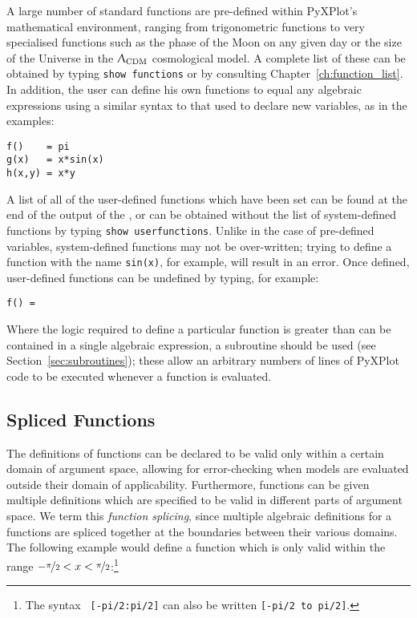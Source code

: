 A large number of standard functions are pre-defined within PyXPlot's
mathematical environment, ranging from trigonometric functions to very
specialised functions such as the phase of the Moon on any given day or the
size of the Universe in the $\Uplambda_\mathrm{CDM}$ cosmological model. A
complete list of these can be obtained by typing {\tt show
functions} or by consulting
Chapter~\ref{ch:function_list}. In addition, the user can define his own
functions to equal any algebraic expressions using a similar syntax to that
used to declare new variables, as in the examples:

\begin{verbatim}
f()    = pi
g(x)   = x*sin(x)
h(x,y) = x*y
\end{verbatim}

A list of all of the user-defined functions which have been set can be found at
the end of the output of the , or can be obtained
without the list of system-defined functions by typing {\tt show
userfunctions}. Unlike in the case of pre-defined
variables, system-defined functions may not be over-written; trying to define a
function with the name {\tt sin(x)}, for example, will result in an error.
Once defined, user-defined functions can be undefined by typing, for example:

\begin{verbatim}
f() =
\end{verbatim}

Where the logic required to define a particular function is greater than can be
contained in a single algebraic expression, a subroutine should be used (see
Section~\ref{sec:subroutines}); these allow an arbitrary numbers of lines of
PyXPlot code to be executed whenever a function is evaluated.

\subsection{Spliced Functions}  

The definitions of functions can be declared to be valid only within a certain
domain of argument space, allowing for error-checking when models are evaluated
outside their domain of applicability. Furthermore, functions can be given
multiple definitions which are specified to be valid in different parts of
argument space. We term this {\it function splicing}, since multiple algebraic
definitions for a functions are spliced together at the boundaries between
their various domains.  The following example would define a function which is
only valid within the range
$-\nicefrac{\pi}{2}<x<\nicefrac{\pi}{2}$:\footnote{The syntax {\tt
[-pi/2:pi/2]} can also be written {\tt [-pi/2 to pi/2]}.}

